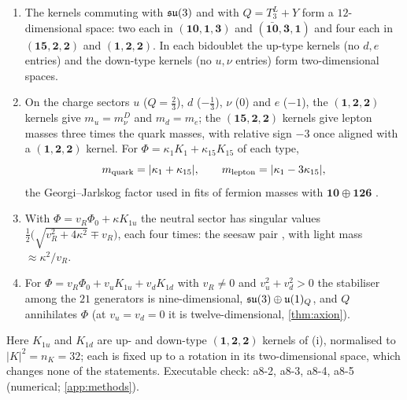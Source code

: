\begin{proposition}
\label{prop:EW}
\begin{enumerate}[label=(\roman*),leftmargin=2.2em]
\item The kernels commuting with $\mathfrak{su}(3)$ and with $Q=T^L_3+Y$ form a $12$-dimensional space: two each in $(\mathbf{10},\mathbf1,\mathbf3)$ and $(\bar{\mathbf{10}},\mathbf3,\mathbf1)$ and four
each in $(\mathbf{15},\mathbf2,\mathbf2)$ and $(\mathbf1,\mathbf2,\mathbf2)$. In each bidoublet the up-type kernels (no $d,e$ entries) and the down-type kernels (no $u,\nu$ entries)
form two-dimensional spaces.
\item On the charge sectors $u$ ($Q=\tfrac23$), $d$ ($-\tfrac13$), $\nu$ ($0$) and $e$ ($-1$), the $(\mathbf1,\mathbf2,\mathbf2)$ kernels give $m_u=m_\nu^D$ and $m_d=m_e$; the
$(\mathbf{15},\mathbf2,\mathbf2)$ kernels give lepton masses three times the quark masses, with relative sign $-3$ once aligned with a $(\mathbf1,\mathbf2,\mathbf2)$ kernel. For
$\Phi=\kappa_1K_1+\kappa_{15}K_{15}$ of each type,
\[
m_{\rm quark}=|\kappa_1+\kappa_{15}|,\qquad m_{\rm lepton}=|\kappa_1-3\kappa_{15}|,
\]
the Georgi--Jarlskog factor \cite{GeorgiJarlskog79} used in fits of fermion masses with $\mathbf{10}\oplus\mathbf{126}$ \cite{BabuMohapatra93}.
\item With $\Phi=v_R\Phi_0+\kappa K_{1u}$ the neutral sector has singular values $\tfrac12\bigl(\sqrt{v_R^2+4\kappa^2}\mp v_R\bigr)$, each four times: the seesaw pair
\cite{Minkowski77,MohapatraSenjanovic80}, with light mass $\approx\kappa^2/v_R$.
\item For $\Phi=v_R\Phi_0+v_uK_{1u}+v_dK_{1d}$ with $v_R\neq0$ and $v_u^2+v_d^2>0$ the stabiliser among the $21$ generators is nine-dimensional, $\mathfrak{su}(3)\oplus\mathfrak{u}(1)_Q$,
and $Q$ annihilates $\Phi$ (at $v_u=v_d=0$ it is twelve-dimensional, \cref{thm:axion}).
\end{enumerate}
\end{proposition}

\noindent Here $K_{1u}$ and $K_{1d}$ are up- and down-type $(\mathbf1,\mathbf2,\mathbf2)$ kernels of (i), normalised to $|K|^2=n_K=32$; each is fixed up to a
rotation in its two-dimensional space, which changes none of the statements. Executable check: a8-2, a8-3, a8-4, a8-5 (numerical; \cref{app:methods}).

